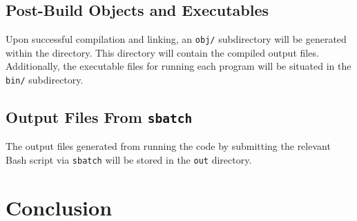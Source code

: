 \documentclass[12pt]{article}
\begin{document}
\subsection{Post-Build Objects and Executables}
Upon successful compilation and linking, an \texttt{obj/} subdirectory will be generated within the directory. 
This directory will contain the compiled output files. Additionally, the executable files for running each program will be 
situated in the \texttt{bin/} subdirectory.

\subsection{Output Files From \texttt{sbatch}}
The output files generated from running the code by submitting the relevant Bash script via \texttt{sbatch} will be 
stored in the \texttt{out} directory. 

\section{Conclusion}
\end{document}
